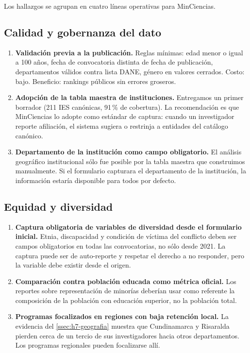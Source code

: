 \documentclass[11pt,a4paper,oneside]{article}
\begin{document}
Los hallazgos se agrupan en cuatro líneas operativas para MinCiencias.

\subsection{Calidad y gobernanza del dato}

\begin{enumerate}[label=A.\arabic*., leftmargin=*]
\item \textbf{Validación previa a la publicación.} Reglas mínimas: edad menor o igual a 100 años, fecha de convocatoria distinta de fecha de publicación, departamentos válidos contra lista DANE, género en valores cerrados. Costo: bajo. Beneficio: rankings públicos sin errores groseros.
\item \textbf{Adopción de la tabla maestra de instituciones.} Entregamos un primer borrador (211 IES canónicas, 91\,\% de cobertura). La recomendación es que MinCiencias lo adopte como estándar de captura: cuando un investigador reporte afiliación, el sistema sugiera o restrinja a entidades del catálogo canónico.
\item \textbf{Departamento de la institución como campo obligatorio.} El análisis geográfico institucional sólo fue posible por la tabla maestra que construimos manualmente. Si el formulario capturara el departamento de la institución, la información estaría disponible para todos por defecto.
\end{enumerate}

\subsection{Equidad y diversidad}

\begin{enumerate}[label=B.\arabic*., leftmargin=*]
\item \textbf{Captura obligatoria de variables de diversidad desde el formulario inicial.} Etnia, discapacidad y condición de víctima del conflicto deben ser campos obligatorios en todas las convocatorias, no sólo desde 2021. La captura puede ser de auto-reporte y respetar el derecho a no responder, pero la variable debe existir desde el origen.
\item \textbf{Comparación contra población educada como métrica oficial.} Los reportes sobre representación de minorías deberían usar como referente la composición de la población con educación superior, no la población total.
\item \textbf{Programas focalizados en regiones con baja retención local.} La evidencia del \ref{ssec:h7-geografia} muestra que Cundinamarca y Risaralda pierden cerca de un tercio de sus investigadores hacia otros departamentos. Los programas regionales pueden focalizarse allí.
\end{enumerate}
\end{document}
